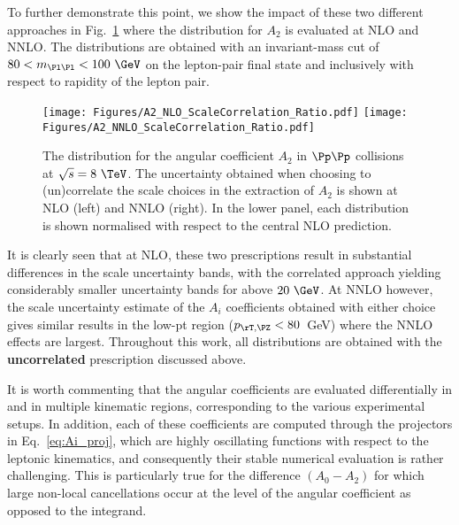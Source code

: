 To further demonstrate this point, we show the impact of these two different approaches in Fig.~\ref{fig:A2_Scales} where the \ptz distribution for $A_2$ is evaluated at NLO and NNLO. The distributions are obtained with an invariant-mass cut of $80 < m_{\Pl\Pl} < 100~\GeV$ on the lepton-pair final state and inclusively with respect to rapidity of the lepton pair.
\begin{figure}
\centering
\texttt{[image: Figures/A2\_NLO\_ScaleCorrelation\_Ratio.pdf]} \hfill
\texttt{[image: Figures/A2\_NNLO\_ScaleCorrelation\_Ratio.pdf]} 
\caption{The \ptz distribution for the angular coefficient $A_2$ in $\Pp\Pp$ collisions at $\sqrt{s} = 8~\TeV$.
The uncertainty obtained when choosing to (un)correlate the scale choices in the extraction of $A_2$ is shown at 
NLO (left) and NNLO (right). In the lower panel, each distribution is shown normalised with respect
to the central NLO prediction.
}
\label{fig:A2_Scales}
\end{figure}
It is clearly seen that at NLO, these two prescriptions result in substantial differences in the scale uncertainty bands, with the correlated approach yielding considerably smaller uncertainty bands for \ptz above $20 ~\GeV$. At NNLO however, the scale uncertainty estimate of the $A_i$ coefficients obtained with either choice gives similar results in the low-pt region ($\ptz < 80$~GeV) where the NNLO effects are largest. Throughout this work, all distributions are obtained with the \textbf{uncorrelated} prescription discussed above.

It is worth commenting that the angular coefficients are evaluated differentially in \ptz
and in multiple kinematic regions, corresponding to the various experimental setups. 
In addition, each of these coefficients are computed through the projectors in Eq.~\eqref{eq:Ai_proj}, 
which are highly oscillating functions with respect to the leptonic kinematics, and consequently 
their stable numerical evaluation is rather challenging. This is particularly true for 
the difference $(A_0-A_2)$ for which large non-local cancellations
occur at the level of the angular coefficient as opposed to the integrand.


